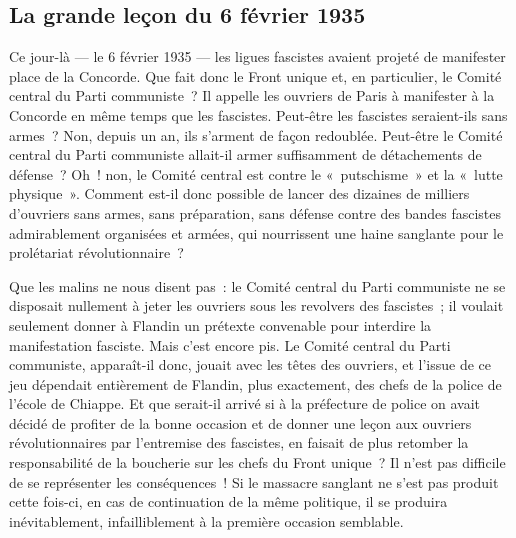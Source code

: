 \documentclass[french,twoside]{book} %
\begin{document}
\subsection[{La grande leçon du 6 février 1935}]{La grande leçon du 6 février 1935}
\noindent Ce jour-là — le 6 février 1935 — les ligues fascistes avaient projeté de manifester place de la Concorde. Que fait donc le Front unique et, en particulier, le Comité central du Parti communiste ? Il appelle les ouvriers de Paris à manifester à la Concorde en même temps que les fascistes. Peut-être les fascistes seraient-ils sans armes ? Non, depuis un an, ils s’arment de façon redoublée. Peut-être le Comité central du Parti communiste allait-il armer suffisamment de détachements de défense ? Oh ! non, le Comité central est contre le « putschisme » et la « lutte physique ». Comment est-il donc possible de lancer des dizaines de milliers d’ouvriers sans armes, sans préparation, sans défense contre des bandes fascistes admirablement organisées et armées, qui nourrissent une haine sanglante pour le prolétariat révolutionnaire ?\par
 Que les malins ne nous disent pas : le Comité central du Parti communiste ne se disposait nullement à jeter les ouvriers sous les revolvers des fascistes ; il voulait seulement donner à Flandin un prétexte convenable pour interdire la manifestation fasciste. Mais c’est encore pis. Le Comité central du Parti communiste, apparaît-il donc, jouait avec les têtes des ouvriers, et l’issue de ce jeu dépendait entièrement de Flandin, plus exactement, des chefs de la police de l’école de Chiappe. Et que serait-il arrivé si à la préfecture de police on avait décidé de profiter de la bonne occasion et de donner une leçon aux ouvriers révolutionnaires par l’entremise des fascistes, en faisait de plus retomber la responsabilité de la boucherie sur les chefs du Front unique ? Il n’est pas difficile de se représenter les conséquences ! Si le massacre sanglant ne s’est pas produit cette fois-ci, en cas de continuation de la même politique, il se produira inévitablement, infailliblement à la première occasion semblable.
\end{document}
